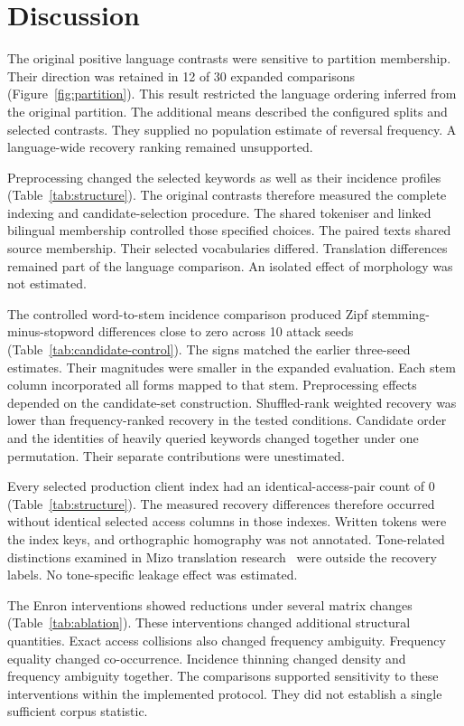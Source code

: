 \documentclass[pdflatex,sn-mathphys-num]{sn-jnl}%
\theoremstyle{thmstyleone}%
\theoremstyle{thmstyletwo}%
\theoremstyle{thmstylethree}%
\newcommand{\IdenticalPairs}{0}
\newcommand{\ExpandedSeeds}{10}
\newcommand{\ExpandedPositiveDirections}{12}
\newcommand{\ExpandedDirectionCount}{30}
\begin{document}
\section{Discussion}
The original positive language contrasts were sensitive to partition membership. Their direction was retained in \ExpandedPositiveDirections{} of \ExpandedDirectionCount{} expanded comparisons (Figure~\ref{fig:partition}). This result restricted the language ordering inferred from the original partition. The additional means described the configured splits and selected contrasts. They supplied no population estimate of reversal frequency. A language-wide recovery ranking remained unsupported.

Preprocessing changed the selected keywords as well as their incidence profiles (Table~\ref{tab:structure}). The original contrasts therefore measured the complete indexing and candidate-selection procedure. The shared tokeniser and linked bilingual membership controlled those specified choices. The paired texts shared source membership. Their selected vocabularies differed. Translation differences remained part of the language comparison. An isolated effect of morphology was not estimated.

The controlled word-to-stem incidence comparison produced Zipf stemming-minus-stopword differences close to zero across \ExpandedSeeds{} attack seeds (Table~\ref{tab:candidate-control}). The signs matched the earlier three-seed estimates. Their magnitudes were smaller in the expanded evaluation. Each stem column incorporated all forms mapped to that stem. Preprocessing effects depended on the candidate-set construction. Shuffled-rank weighted recovery was lower than frequency-ranked recovery in the tested conditions. Candidate order and the identities of heavily queried keywords changed together under one permutation. Their separate contributions were unestimated.

Every selected production client index had an identical-access-pair count of \IdenticalPairs{} (Table~\ref{tab:structure}). The measured recovery differences therefore occurred without identical selected access columns in those indexes. Written tokens were the index keys, and orthographic homography was not annotated. Tone-related distinctions examined in Mizo translation research~\cite{mizotone} were outside the recovery labels. No tone-specific leakage effect was estimated.

The Enron interventions showed reductions under several matrix changes (Table~\ref{tab:ablation}). These interventions changed additional structural quantities. Exact access collisions also changed frequency ambiguity. Frequency equality changed co-occurrence. Incidence thinning changed density and frequency ambiguity together. The comparisons supported sensitivity to these interventions within the implemented protocol. They did not establish a single sufficient corpus statistic.
\end{document}
